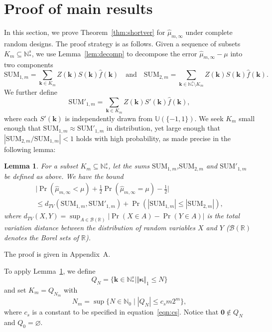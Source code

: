 \documentclass{article}
\newtheorem{lemma}{Lemma}
\theoremstyle{definition}
\renewcommand{\le}{\leqslant}
\renewcommand{\leq}{\leqslant}
\renewcommand{\emptyset}{\varnothing}
\newcommand{\real}{\mathbb{R}}
\newcommand{\natu}{\mathbb{N}}
\newcommand{\bsk}{\boldsymbol{k}}
\newcommand{\bszero}{\boldsymbol{0}}
\newcommand{\bskappa}{\boldsymbol{\kappa}}
\newcommand{\dunif}{\mathbb{U}}
\newcommand{\appA}{A}
\begin{document}
\section{Proof of main results}\label{sec:main}

In this section, we prove Theorem~\ref{thm:shortver} for $\hat{\mu}_{m,\infty}$ under complete random designs. The proof strategy is as follows. Given a sequence of subsets $K_m\subseteq \natu^s_*$, we use Lemma~\ref{lem:decomp} to decompose the error $\hat{\mu}_{m,\infty}-\mu$ into two components
\begin{equation}\label{eqn:SUM1}
    \mathrm{SUM}_{1,m}=\sum_{\bsk\in K_m }Z(\bsk)S(\bsk)\hat{f}(\bsk) \quad \text{and} \quad \mathrm{SUM}_{2,m}=\sum_{\bsk\in  \natu_*^s\setminus K_m}Z(\bsk)S(\bsk)\hat{f}(\bsk).
\end{equation}
We further define
\begin{equation}\label{eqn:SUM'1}
    \mathrm{SUM}'_{1,m}=\sum_{\bsk\in K_m}Z(\bsk)S'(\bsk)\hat{f}(\bsk),
\end{equation}
where each $S'(\bsk)$ is independently drawn from $\dunif(\{-1,1\})$. We seek $K_m$ small enough that $\mathrm{SUM}_{1,m}\approx\mathrm{SUM}'_{1,m}$ in distribution, yet large enough that  $|\mathrm{SUM}_{2,m}/\mathrm{SUM}_{1,m}|< 1$ holds with high probability, as made precise in the following lemma:

\begin{lemma}\label{lem:proofoutline}
    For a subset $K_m\subseteq \natu^s_*$, let the sums $\mathrm{SUM}_{1,m}$,$\mathrm{SUM}_{2,m}$ and $\mathrm{SUM}'_{1,m}$ be defined as above. We have the bound
    \begin{multline*}
        \Big|\Pr(\hat{\mu}_{m,\infty}<\mu)+\frac{1}{2}\Pr(\hat{\mu}_{m,\infty}=\mu)-\frac{1}{2}\Big|\\\leq d_{TV}(\mathrm{SUM}_{1,m},\mathrm{SUM}'_{1,m})+ \Pr(|\mathrm{SUM}_{1,m}|\leq |\mathrm{SUM}_{2,m}| ),
    \end{multline*}
        where $d_{TV}(X,Y)=\sup_{A\in \mathcal{B}(\real)}|\Pr(X\in A)-\Pr(Y\in A)|$ is the total variation distance between the distribution of random variables $X$ and $Y$ ($\mathcal{B}(\real)$ denotes the Borel sets of $\real$).
\end{lemma}

The proof is given in Appendix~\appA.

To apply Lemma~\ref{lem:proofoutline}, we define 
\begin{equation*}
   Q_N=\{\bsk\in \natu_*^s\mid \Vert\bskappa\Vert_1 \leq N\}  
\end{equation*}
and set $K_m=Q_{N_m}$ with
\begin{equation}\label{eqn:Nmdef}
    N_m=\sup \{N\in \natu_0\mid |Q_N|\le c_s m 2^m \},
\end{equation}
where $c_s$ is a constant to be specified in equation~\eqref{eqn:cs}.
Notice that $\bszero\notin Q_N$ and $Q_0=\emptyset$. 
\end{document}
